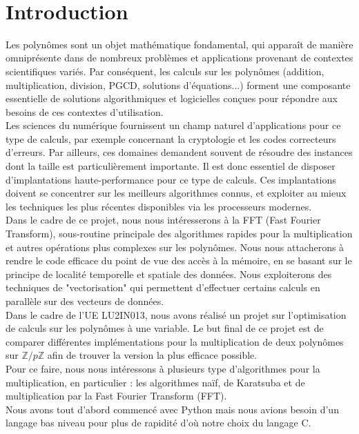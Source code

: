 \documentclass[12pt, a4paper]{article}
\begin{document}
\ 
\\[3cm]
\tableofcontents
\newpage

\section*{Introduction}

Les polynômes sont un objet mathématique fondamental, qui apparaît de manière omniprésente dans de nombreux problèmes et applications provenant de contextes scientifiques variés. Par conséquent, les calculs sur les polynômes (addition, multiplication, division, PGCD, solutions d’équations...) forment une composante essentielle de solutions algorithmiques et logicielles conçues pour répondre aux besoins de ces contextes d’utilisation. \\
Les sciences du numérique fournissent un champ naturel d’applications pour ce type de calculs, par exemple concernant la cryptologie et les codes correcteurs d’erreurs. Par ailleurs, ces domaines demandent souvent de résoudre des instances dont la taille est particulièrement importante. Il est donc essentiel de disposer d’implantations haute-performance pour ce type de calculs. Ces implantations doivent se concentrer sur les meilleurs algorithmes connus, et exploiter au mieux les techniques les plus récentes disponibles via les processeurs modernes. \\
Dans le cadre de ce projet, nous nous intéresserons à la FFT (Fast Fourier Transform), sous-routine principale des algorithmes rapides pour la multiplication et autres opérations plus complexes sur les polynômes. Nous nous attacherons à rendre le code efficace du point de vue des accès à la mémoire, en se basant sur le principe de localité temporelle et spatiale des données. Nous exploiterons des techniques de "vectorisation" qui permettent d’effectuer certains calculs en parallèle sur des vecteurs de données.\\[1cm]

Dans le cadre de l'UE LU2IN013, nous avons réalisé un projet sur l'optimisation de calculs sur les polynômes à une variable. 
Le but final de ce projet est de comparer différentes implémentations pour la multiplication de deux polynômes sur $\mathbb{Z}/p\mathbb{Z}$ afin de trouver la version la plus efficace possible.\\
Pour ce faire, nous nous intéressons à plusieurs type d'algorithmes pour la multiplication, en particulier : les algorithmes naïf, de Karatsuba et de multiplication par la Fast Fourier Transform (FFT).\\
Nous avons tout d'abord commencé avec Python mais nous avions besoin d'un langage bas niveau pour plus de rapidité d'où notre choix du langage C.
\end{document}
